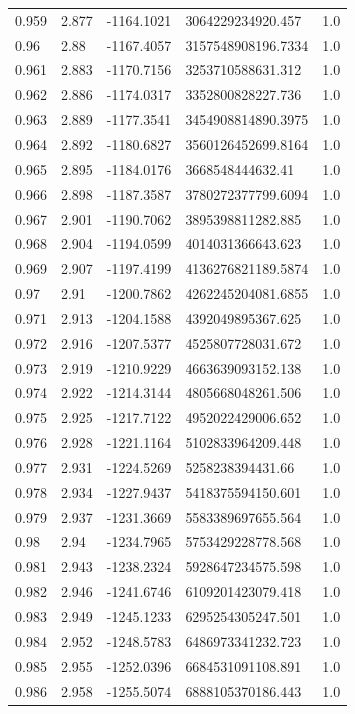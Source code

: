 \begin{tabular}{lllll}
0.959 & 2.877 & -1164.1021 & 3064229234920.457 & 1.0 \\
0.96 & 2.88 & -1167.4057 & 3157548908196.7334 & 1.0 \\
0.961 & 2.883 & -1170.7156 & 3253710588631.312 & 1.0 \\
0.962 & 2.886 & -1174.0317 & 3352800828227.736 & 1.0 \\
0.963 & 2.889 & -1177.3541 & 3454908814890.3975 & 1.0 \\
0.964 & 2.892 & -1180.6827 & 3560126452699.8164 & 1.0 \\
0.965 & 2.895 & -1184.0176 & 3668548444632.41 & 1.0 \\
0.966 & 2.898 & -1187.3587 & 3780272377799.6094 & 1.0 \\
0.967 & 2.901 & -1190.7062 & 3895398811282.885 & 1.0 \\
0.968 & 2.904 & -1194.0599 & 4014031366643.623 & 1.0 \\
0.969 & 2.907 & -1197.4199 & 4136276821189.5874 & 1.0 \\
0.97 & 2.91 & -1200.7862 & 4262245204081.6855 & 1.0 \\
0.971 & 2.913 & -1204.1588 & 4392049895367.625 & 1.0 \\
0.972 & 2.916 & -1207.5377 & 4525807728031.672 & 1.0 \\
0.973 & 2.919 & -1210.9229 & 4663639093152.138 & 1.0 \\
0.974 & 2.922 & -1214.3144 & 4805668048261.506 & 1.0 \\
0.975 & 2.925 & -1217.7122 & 4952022429006.652 & 1.0 \\
0.976 & 2.928 & -1221.1164 & 5102833964209.448 & 1.0 \\
0.977 & 2.931 & -1224.5269 & 5258238394431.66 & 1.0 \\
0.978 & 2.934 & -1227.9437 & 5418375594150.601 & 1.0 \\
0.979 & 2.937 & -1231.3669 & 5583389697655.564 & 1.0 \\
0.98 & 2.94 & -1234.7965 & 5753429228778.568 & 1.0 \\
0.981 & 2.943 & -1238.2324 & 5928647234575.598 & 1.0 \\
0.982 & 2.946 & -1241.6746 & 6109201423079.418 & 1.0 \\
0.983 & 2.949 & -1245.1233 & 6295254305247.501 & 1.0 \\
0.984 & 2.952 & -1248.5783 & 6486973341232.723 & 1.0 \\
0.985 & 2.955 & -1252.0396 & 6684531091108.891 & 1.0 \\
0.986 & 2.958 & -1255.5074 & 6888105370186.443 & 1.0 \\

\end{tabular}

